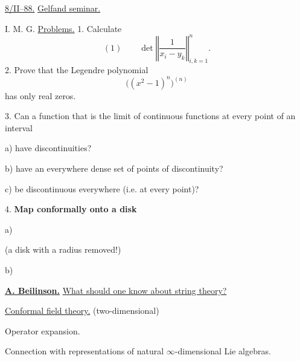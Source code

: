 \underline{8/II--88.} \underline{Gelfand seminar.}

I. M. G. \underline{Problems.} 1. Calculate
\begin{equation*}
(1)\qquad \det\left\Vert\frac{1}{x_i-y_k}\right\Vert_{i,k=1}^{n}.
\end{equation*}
2. Prove that the Legendre polynomial
\begin{equation*}
\bigl((x^2-1)^n\bigr)^{(n)}
\end{equation*}
has only real zeros.

3. Can a function that is the limit of continuous functions at every point of an interval

a) have discontinuities?

b) have an everywhere dense set of points of discontinuity?

c) be discontinuous everywhere (i.e. at every point)?

4. \textbf{Map conformally onto a disk}

a)\quad
{}
\quad (a disk with a radius removed!)

b)
\begin{center}
\end{center}

\underline{\textbf{A. Beilinson.}} \qquad
\underline{What should one know about string theory?}

\underline{Conformal field theory.} \qquad (two-dimensional)

Operator expansion.

Connection with representations of natural $\infty$-dimensional Lie algebras.

